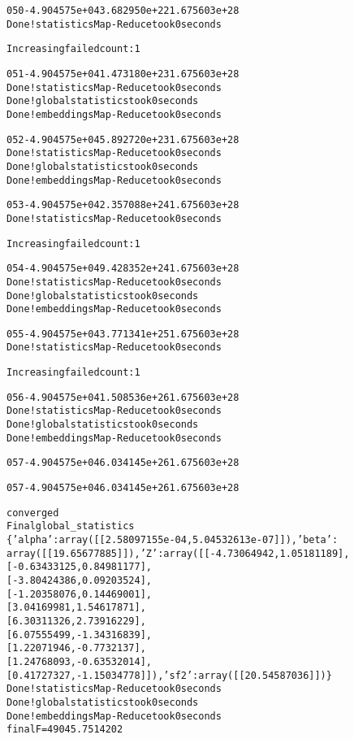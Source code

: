 \documentclass[letterpaper,10pt,english]{/usr/share/sphinx/texinputs/sphinxhowto}
\newenvironment{InvisibleVerbatim}
        {\begin{mdframed}[leftmargin=0.1\linewidth,innerleftmargin=3pt,innerrightmargin=3pt, userdefinedwidth=1\linewidth, linewidth=0pt, linecolor=white, usetwoside=false]}
        {\end{mdframed}}
\begin{document}
\begin{InvisibleVerbatim}
\begin{alltt}
 050  -4.904575e+04   3.682950e+22   1.675603e+28
Done! statistics Map-Reduce took  0  seconds

        Increasing failed count: 1


 051  -4.904575e+04   1.473180e+23   1.675603e+28
Done! statistics Map-Reduce took  0  seconds
Done! global statistics took  0  seconds
Done! embeddings Map-Reduce took  0  seconds

 052  -4.904575e+04   5.892720e+23   1.675603e+28
Done! statistics Map-Reduce took  0  seconds
Done! global statistics took  0  seconds
Done! embeddings Map-Reduce took  0  seconds

 053  -4.904575e+04   2.357088e+24   1.675603e+28
Done! statistics Map-Reduce took  0  seconds

        Increasing failed count: 1


 054  -4.904575e+04   9.428352e+24   1.675603e+28
Done! statistics Map-Reduce took  0  seconds
Done! global statistics took  0  seconds
Done! embeddings Map-Reduce took  0  seconds

 055  -4.904575e+04   3.771341e+25   1.675603e+28
Done! statistics Map-Reduce took  0  seconds

        Increasing failed count: 1


 056  -4.904575e+04   1.508536e+26   1.675603e+28
Done! statistics Map-Reduce took  0  seconds
Done! global statistics took  0  seconds
Done! embeddings Map-Reduce took  0  seconds

 057  -4.904575e+04   6.034145e+26   1.675603e+28

 057  -4.904575e+04   6.034145e+26   1.675603e+28


converged
Final global\_statistics
\{'alpha': array([[  2.58097155e-04,   5.04532613e-07]]), 'beta':
array([[ 19.65677885]]), 'Z': array([[-4.73064942,  1.05181189],
       [-0.63433125,  0.84981177],
       [-3.80424386,  0.09203524],
       [-1.20358076,  0.14469001],
       [ 3.04169981,  1.54617871],
       [ 6.30311326,  2.73916229],
       [ 6.07555499, -1.34316839],
       [ 1.22071946, -0.7732137 ],
       [ 1.24768093, -0.63532014],
       [ 0.41727327, -1.15034778]]), 'sf2': array([[ 20.54587036]])\}
Done! statistics Map-Reduce took  0  seconds
Done! global statistics took  0  seconds
Done! embeddings Map-Reduce took  0  seconds
final F=49045.7514202
\end{alltt}

            \end{InvisibleVerbatim}
            
\end{document}
